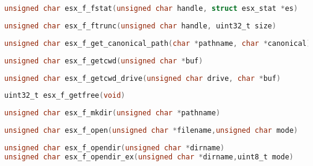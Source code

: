 \documentclass[11pt]{book}
\def\lthtmlcheckvsize{\ifdim\ht\sizebox<\vsize 
  \ifdim\wd\sizebox<\hsize\expandafter\hfill\fi \expandafter\vfill
  \else\expandafter\vss\fi}%
\begin{document}
{\newpage\clearpage
{}%
\begin{lstlisting}[language=C]
unsigned char esx_f_fstat(unsigned char handle, struct esx_stat *es)
\end{lstlisting}%
\lthtmlfigureZ
\lthtmlcheckvsize\clearpage}

{\newpage\clearpage
{}%
\begin{lstlisting}[language=C]
unsigned char esx_f_ftrunc(unsigned char handle, uint32_t size)
\end{lstlisting}%
\lthtmlfigureZ
\lthtmlcheckvsize\clearpage}

{\newpage\clearpage
{}%
\begin{lstlisting}[language=C]
unsigned char esx_f_get_canonical_path(char *pathname, char *canonical)
\end{lstlisting}%
\lthtmlfigureZ
\lthtmlcheckvsize\clearpage}

{\newpage\clearpage
{}%
\begin{lstlisting}[language=C]
unsigned char esx_f_getcwd(unsigned char *buf)
\end{lstlisting}%
\lthtmlfigureZ
\lthtmlcheckvsize\clearpage}

{\newpage\clearpage
{}%
\begin{lstlisting}[language=C]
unsigned char esx_f_getcwd_drive(unsigned char drive, char *buf)
\end{lstlisting}%
\lthtmlfigureZ
\lthtmlcheckvsize\clearpage}

{\newpage\clearpage
{}%
\begin{lstlisting}[language=C]
uint32_t esx_f_getfree(void)
\end{lstlisting}%
\lthtmlfigureZ
\lthtmlcheckvsize\clearpage}

{\newpage\clearpage
{}%
\begin{lstlisting}[language=C]
unsigned char esx_f_mkdir(unsigned char *pathname)
\end{lstlisting}%
\lthtmlfigureZ
\lthtmlcheckvsize\clearpage}

{\newpage\clearpage
{}%
\begin{lstlisting}[language=C]
unsigned char esx_f_open(unsigned char *filename,unsigned char mode)
\end{lstlisting}%
\lthtmlfigureZ
\lthtmlcheckvsize\clearpage}

{\newpage\clearpage
{}%
\begin{lstlisting}[language=C]
unsigned char esx_f_opendir(unsigned char *dirname)
unsigned char esx_f_opendir_ex(unsigned char *dirname,uint8_t mode)
\end{lstlisting}%
\lthtmlfigureZ
\lthtmlcheckvsize\clearpage}
\end{document}
